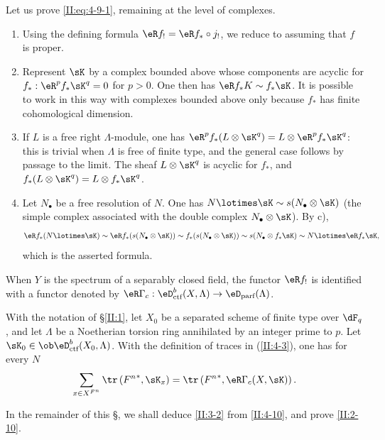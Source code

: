 \documentclass[oneside]{book}
\begin{document}
Let us prove \eqref{II:eq:4-9-1}, remaining at the level of complexes.
\begin{enumerate}[\indent a)]
  \item Using the defining formula $\eR f_! = \eR f_*\circ j_!$, we reduce to
    assuming that $f$ is proper.
  \item Represent $\sK$ by a complex bounded above whose components are
    acyclic for $f_*:\eR^p f_* \sK^q = 0$ for $p>0$. One then has
    $\eR f_* K \sim f_* \sK$. It is possible to work in this way with
    complexes bounded above only because $f_*$ has finite cohomological
    dimension.
  \item If $L$ is a free right $\Lambda$-module, one has
    $\eR^p f_*(L\otimes \sK^q) = L\otimes \eR^p f_* \sK^q$: this is trivial
    when $\Lambda$ is free of finite type, and the general case follows by
    passage to the limit. The sheaf $L\otimes \sK^q$ is acyclic for $f_*$,
    and $f_*(L\otimes \sK^q) = L\otimes f_* \sK^q$.
  \item Let $N_\bullet$ be a free resolution of $N$. One has
    $N\lotimes \sK\sim s(N_\bullet\otimes \sK)$ (the simple complex
    associated with the double complex $N_\bullet\otimes \sK$). By c),
    \[
      \eR f_*(N\lotimes \sK) \sim \eR f_* (s(N_\bullet\otimes \sK)) \sim f_*(s(N_\bullet\otimes \sK)) \sim s(N_\bullet\otimes f_* \sK) \sim N\lotimes \eR f_* \sK \text{,}
    \]
    which is the asserted formula.
\end{enumerate}

When $Y$ is the spectrum of a separably closed field, the functor $\eR f_!$
is identified with a functor denoted by
$\eR \Gamma_c : \eD_\text{ctf}^b(X,\Lambda)\to\eD_\text{parf}(\Lambda)$.






\begin{theorem_}\label{II:4-10}
With the notation of \S\ref{II:1}, let $X_0$ be a separated scheme of finite
type over $\dF_q$, and let $\Lambda$ be a Noetherian torsion ring annihilated
by an integer prime to $p$. Let
$\sK_0\in\ob\eD_\textnormal{ctf}^b(X_0,\Lambda)$. With the definition of
traces in (\ref{II:4-3}), one has for every $N$
\begin{equation*}\label{II:eq:4-10}
  \sum_{x\in X^{F^n}} \tr\left({F^n}^*,\sK_x\right) = \tr\left({F^n}^*,\eR\Gamma_c(X,\sK)\right) \text{.}
\end{equation*}
\end{theorem_}

In the remainder of this \S, we shall deduce \ref{II:3-2} from
\ref{II:4-10}, and prove \ref{II:2-10}.
\end{document}

